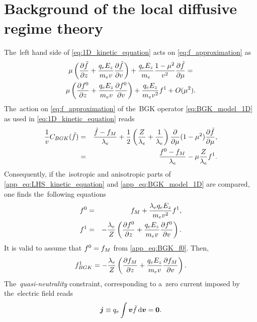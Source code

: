 \section{Background of the local diffusive regime theory}
\label{app:DiffusiveKinetics}

The~left hand side of \eqref{eq:1D_kinetic_equation} acts on 
\eqref{eq:f_approximation} as
\begin{multline}
  \mu\left(\frac{\partial{\tilde{f}}}{\partial{z}} 
  + \frac{q_eE_z}{m_ev}\frac{\partial{\tilde{f}}}{\partial{v}}\right) 
  + \frac{q_eE_z}{m_e}\frac{1-\mu^2}{v^2}\frac{\partial{\tilde{f}}}{\partial{\mu}} = \\
  \mu\left(\frac{\partial{f^0}}{\partial{z}} + \frac{q_eE_z}{m_ev}\frac{\partial{f^0}}{\partial{v}}\right) 
  + \frac{q_eE_z}{m_ev^2} f^1 + O(\mu^2) .
  \label{app_eq:LHS_kinetic_equation}
\end{multline}
The~action on \eqref{eq:f_approximation} of the~BGK operator 
\eqref{eq:BGK_model_1D} as used in \eqref{eq:1D_kinetic_equation} reads
\begin{eqnarray}
  \frac{1}{v}C_{BGK}(\tilde{f})
  &=&
  \frac{\tilde{f} - f_M}{\lambda_e}
  + \frac{1}{2}\left(\frac{Z}{\lambda_e} + \frac{1}{\lambda_e}\right)
  \frac{\partial{}}{\partial{\mu}}(1 - \mu^2)\frac{\partial{\tilde{f}}}{\partial{\mu}} ,\nonumber\\
  &=&  \frac{f^0 - f_M}{\lambda_e}
  - \mu \frac{Z}{\lambda_e}f^1 .
  \label{app_eq:BGK_model_1D}
\end{eqnarray}
Consequently, if the~isotropic and anisotropic parts of 
\eqref{app_eq:LHS_kinetic_equation} and \eqref{app_eq:BGK_model_1D} are 
compared, one finds the~following equations 
\begin{eqnarray}
  f^0 &=& f_M + \frac{\lambda_eq_eE_z}{m_ev^2}f^1 ,
  \label{app_eq:BGK_f0} \\
  f^1 &=& - \frac{\lambda_e}{Z}
  \left( \frac{\partial{f^0}}{\partial{z}} + \frac{q_eE_z}{m_ev}\frac{\partial{f^0}}{\partial{v}} \right) . 
  \label{app_eq:BGK_f1}
\end{eqnarray}
It is valid to assume that $f^0 = f_M$ from \eqref{app_eq:BGK_f0}. Then,
\begin{equation}
  f^1_{BGK} = - \frac{\lambda_e}{Z}
  \left( \frac{\partial{f_M}}{\partial{z}} + \frac{q_eE_z}{m_ev}\frac{\partial{f_M}}{\partial{v}} \right) . 
  \label{app_eq:BGK_f1_fM}
\end{equation}
The~\textit{quasi-neutrality} constraint, corresponding to a~zero current 
imposed by the~electric field reads
\begin{equation}
\boldsymbol{j} \equiv q_e \int \boldsymbol{v} \tilde{f} \, \text{d}\boldsymbol{v} = \boldsymbol{0} .
\end{equation}
